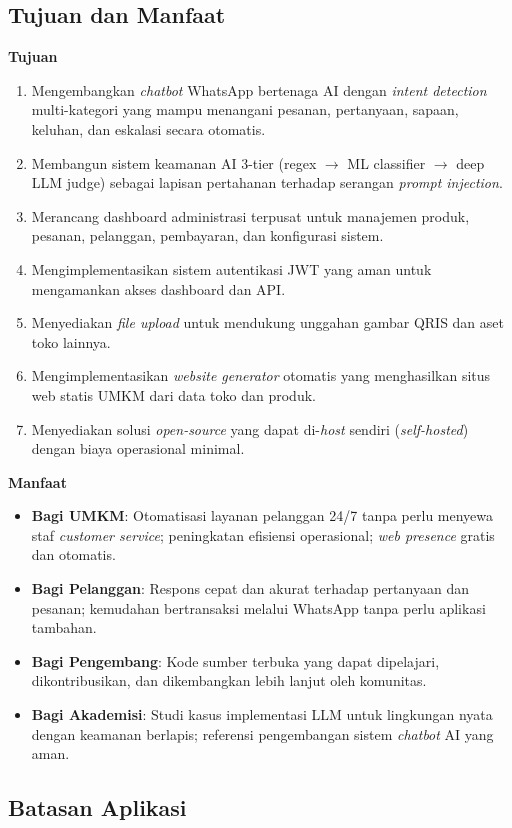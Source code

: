 \documentclass[12pt,a4paper,oneside]{article}
\newcommand{\sub}[1]{%
    \subsection{#1}%
}
\begin{document}
\sub{Tujuan dan Manfaat}

\textbf{Tujuan}

\begin{enumerate}
	\item Mengembangkan \textit{chatbot} WhatsApp bertenaga AI dengan \textit{intent detection} multi-kategori yang mampu menangani pesanan, pertanyaan, sapaan, keluhan, dan eskalasi secara otomatis.
	\item Membangun sistem keamanan AI 3-tier (regex $\rightarrow$ ML classifier $\rightarrow$ deep LLM judge) sebagai lapisan pertahanan terhadap serangan \textit{prompt injection}.
	\item Merancang dashboard administrasi terpusat untuk manajemen produk, pesanan, pelanggan, pembayaran, dan konfigurasi sistem.
	\item Mengimplementasikan sistem autentikasi JWT yang aman untuk mengamankan akses dashboard dan API.
	\item Menyediakan \textit{file upload} untuk mendukung unggahan gambar QRIS dan aset toko lainnya.
	\item Mengimplementasikan \textit{website generator} otomatis yang menghasilkan situs web statis UMKM dari data toko dan produk.
	\item Menyediakan solusi \textit{open-source} yang dapat di-\textit{host} sendiri (\textit{self-hosted}) dengan biaya operasional minimal.
\end{enumerate}

\textbf{Manfaat}

\begin{itemize}
	\item \textbf{Bagi UMKM}: Otomatisasi layanan pelanggan 24/7 tanpa perlu menyewa staf \textit{customer service}; peningkatan efisiensi operasional; \textit{web presence} gratis dan otomatis.
	\item \textbf{Bagi Pelanggan}: Respons cepat dan akurat terhadap pertanyaan dan pesanan; kemudahan bertransaksi melalui WhatsApp tanpa perlu aplikasi tambahan.
	\item \textbf{Bagi Pengembang}: Kode sumber terbuka yang dapat dipelajari, dikontribusikan, dan dikembangkan lebih lanjut oleh komunitas.
	\item \textbf{Bagi Akademisi}: Studi kasus implementasi LLM untuk lingkungan nyata dengan keamanan berlapis; referensi pengembangan sistem \textit{chatbot} AI yang aman.
\end{itemize}

\sub{Batasan Aplikasi}
\end{document}
